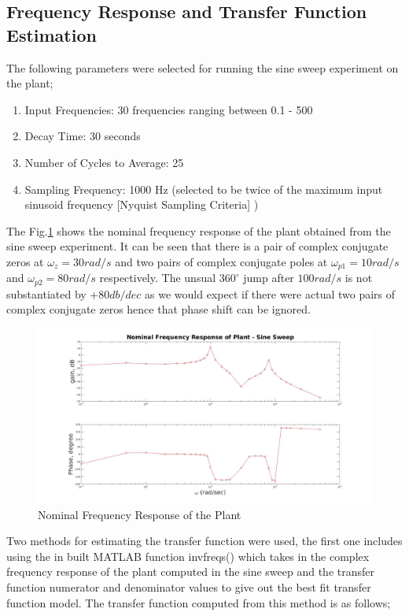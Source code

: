 \documentclass[11pt,usenames]{article}
\begin{document}
\subsection{Frequency Response and Transfer Function Estimation}

The following parameters were selected for running the sine sweep experiment on the plant;

\begin{enumerate}
	\item Input Frequencies: 30 frequencies ranging between 0.1 - 500 
	\item Decay Time: 30 seconds
	\item Number of Cycles to Average: 25
	\item Sampling Frequency: 1000 Hz (selected to be twice of the maximum input sinusoid frequency [Nyquist Sampling Criteria] )
\end{enumerate}

The Fig.\ref{fig:NominalSineSweep} shows the nominal frequency response of the plant obtained from the sine sweep experiment. It can be seen that there is a pair of complex conjugate zeros at $ \omega_z = 30 rad/s $ and two pairs of complex conjugate poles at $ \omega_{p1} = 10 rad/s $ and $ \omega_{p2} = 80 rad/s $ respectively. The unsual $ 360^{\circ} $ jump after $ 100 rad/s $ is not substantiated by $ +80db/dec $ as we would expect if there were actual two pairs of complex conjugate zeros hence that phase shift can be ignored.
  
\begin{figure}[htpb]
	\centering
	\includegraphics[width=1\columnwidth]{NominalSineSweep.jpg}
	\caption{Nominal Frequency Response of the Plant}
	\label{fig:NominalSineSweep}
\end{figure}

Two methods for estimating the transfer function were used, the first one includes using the in built MATLAB function invfreqs() which takes in the complex frequency response of the plant computed in the sine sweep and the transfer function numerator and denominator values to give out the best fit transfer function model. 
The transfer function computed from this method is as follows;
\end{document}
